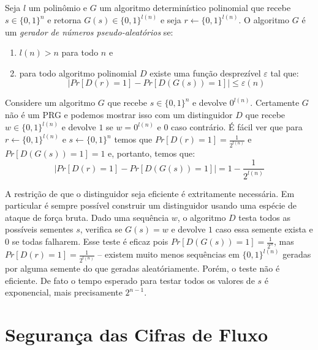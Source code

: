 \begin{definition}
  Seja $l$ um polinômio e $G$ um algoritmo determinístico polinomial que recebe $s \in \{0,1\}^n$ e retorna $G(s) \in \{0,1\}^{l(n)}$ e seja $r \leftarrow \{0,1\}^{l(n)}$.
  O algoritmo $G$ é um {\em gerador de números pseudo-aleatórios} se:
\begin{enumerate}
\item $l(n) > n$ para todo $n$ e
\item para todo algoritmo polinomial $D$ existe uma função desprezível $\varepsilon$ tal que:
\begin{displaymath}
  |Pr[D(r) = 1] - Pr[D(G(s)) = 1]| \leq \varepsilon(n)  
\end{displaymath}
\end{enumerate}
\end{definition}


\begin{example}
  Considere um algoritmo $G$ que recebe $s \in \{0,1\}^n$ e devolve $0^{l(n)}$.
  Certamente $G$ não é um PRG e podemos mostrar isso com um distinguidor $D$ que recebe $w \in \{0,1\}^{l(n)}$ e devolve $1$ se $w = 0^{l(n)}$ e $0$ caso contrário.
  É fácil ver que para $r \leftarrow \{0,1\}^{l(n)}$ e $s \leftarrow \{0,1\}^n$ temos que $Pr[D(r) = 1] = \frac{1}{2^{l(n)}}$ e $Pr[D(G(s)) = 1] = 1$ e, portanto, temos que:
\begin{displaymath}
  |Pr[D(r) = 1] - Pr[D(G(s)) = 1]| = 1 - \frac{1}{2^{l(n)}}
\end{displaymath}

\end{example}


A restrição de que o distinguidor seja eficiente é extritamente necessária.
Em particular é sempre possível construir um distinguidor usando uma espécie de ataque de força bruta.
Dado uma sequência $w$, o algoritmo $D$ testa todos as possíveis sementes $s$, verifica se $G(s) = w$ e devolve $1$ caso essa semente exista e $0$ se todas falharem.
Esse teste é eficaz pois $Pr[D(G(s)) = 1] =  \frac{1}{2^n}$, mas $Pr[D(r) = 1] = \frac{1}{2^{l(n)}}$ -- existem muito menos sequências em $\{0,1\}^{l(n)}$ geradas por alguma semente do que geradas aleatóriamente.
Porém, o teste não é eficiente.
De fato o tempo esperado para testar todos os valores de $s$ é exponencial, mais precisamente $2^{n-1}$. 

\section{Segurança das Cifras de Fluxo}
\label{sec:streamcipher-sec}

